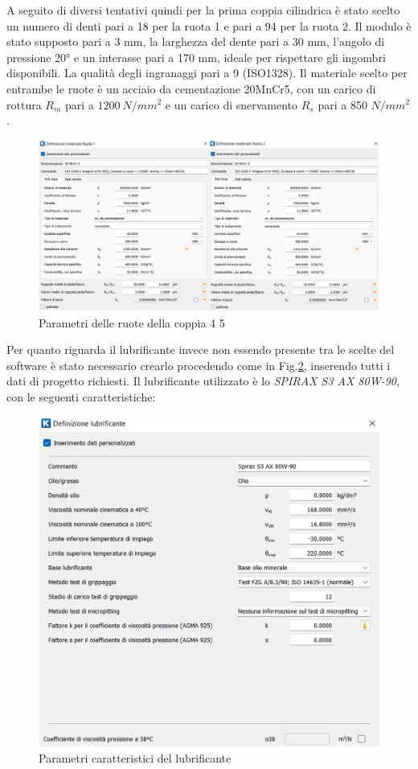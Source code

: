 A seguito di diversi tentativi quindi per la prima coppia cilindrica è stato scelto un numero di denti pari a 18 per la ruota 1 e pari a 94 per la ruota 2. Il modulo è stato supposto pari a 3 mm, la larghezza del dente pari a 30 mm, l’angolo di pressione 20° e un interasse pari a 170 mm, ideale per rispettare gli ingombri disponibili. La qualità degli ingranaggi pari a 9 (ISO1328). Il materiale scelto per entrambe le ruote è un acciaio da cementazione 20MnCr5, con un carico di rottura $R_m$ pari a $1200\ N/mm^2$ e un carico di snervamento $R_s$ pari a 850 $N/mm^2$. 
\begin{figure}[h]
    \centering
    \includegraphics[scale=0.5]{Immagini/RuoteCoppia45.png}
    \caption{Parametri delle ruote della coppia 4 5}
    \label{fig:RuoteCoppia45}
\end{figure}
\newpage
Per quanto riguarda il lubrificante invece non essendo presente tra le scelte del software è stato necessario crearlo procedendo come in Fig.\ref{fig:LubrificanteCoppia45}, inserendo tutti i dati di progetto richiesti. Il lubrificante utilizzato è lo \textit{SPIRAX S3 AX 80W-90}, con le seguenti caratteristiche: 
\begin{figure}[h]
    \centering
    \includegraphics[scale=0.35]{Immagini/LubrificanteCoppia45.png}
    \caption{Parametri caratteristici del lubrificante}
    \label{fig:LubrificanteCoppia45}
\end{figure}

